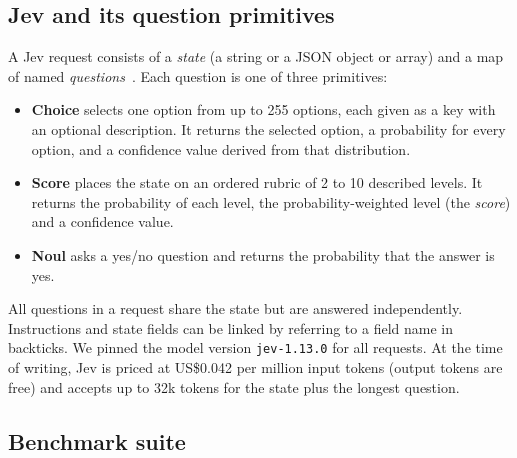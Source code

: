 \documentclass[table]{article}
\begin{document}
\subsection{Jev and its question primitives}

A Jev request consists of a \emph{state} (a string or a JSON object or array) and a map of named \emph{questions}~\cite{typesafe2026jev}. Each question is one of three primitives:
\begin{itemize}[leftmargin=*,noitemsep]
    \item \textbf{Choice} selects one option from up to 255 options, each given as a key with an optional description. It returns the selected option, a probability for every option, and a confidence value derived from that distribution.
    \item \textbf{Score} places the state on an ordered rubric of 2 to 10 described levels. It returns the probability of each level, the probability-weighted level (the \emph{score}) and a confidence value.
    \item \textbf{Noul} asks a yes/no question and returns the probability that the answer is yes.
\end{itemize}
All questions in a request share the state but are answered independently. Instructions and state fields can be linked by referring to a field name in backticks. We pinned the model version \texttt{jev-1.13.0} for all requests. At the time of writing, Jev is priced at US\$0.042 per million input tokens (output tokens are free) and accepts up to 32k tokens for the state plus the longest question.

\subsection{Benchmark suite}
\end{document}
